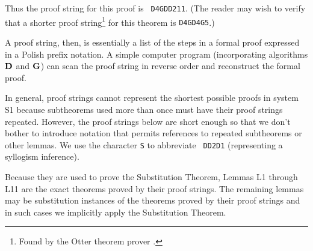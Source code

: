 \documentclass[leqno]{article}
\begin{document}
\vspace{1ex} \noindent Thus the proof string for this proof is {\tt
D4GDD211}.  (The reader may wish to verify that a shorter proof
string\footnote{Found by the {\sc Otter} theorem prover \cite{Wos}.} for
this theorem is {\tt D4GD4G5}.)

     A proof string, then, is essentially a list of the steps in a formal
proof expressed in a Polish prefix notation.  A simple computer program
(incorporating algorithms ${\bf D}$ and ${\bf G}$) can scan the proof string
in reverse order and reconstruct the formal proof.

     In general, proof strings cannot represent the shortest possible proofs
in system S1 because subtheorems used more than once must have their proof
strings repeated.  However, the proof strings below are short enough so that
we don't bother to introduce notation that permits references to repeated
subtheorems or other lemmas.  We use the character {\tt S} to abbreviate {\tt
DD2D1} (representing a syllogism inference).

     Because they are used to prove the Substitution Theorem, Lemmas L1
through L11 are the exact theorems proved by their proof strings.  The
remaining lemmas may be substitution instances of the theorems proved by their
proof strings and in such cases we implicitly apply the Substitution Theorem.
\end{document}
